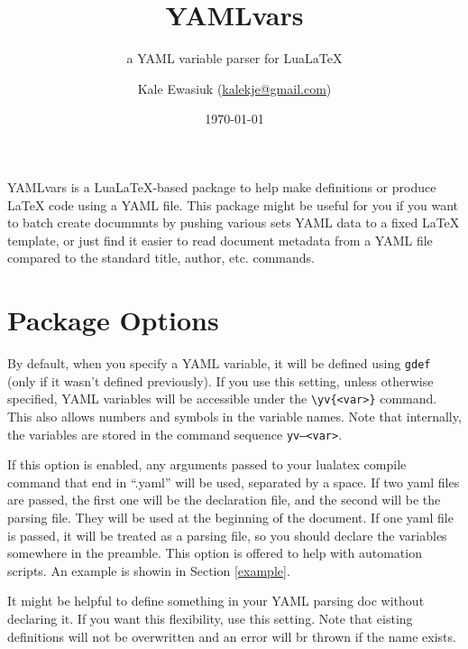 \documentclass[11pt,parskip=half]{scrartcl}
\author{Kale Ewasiuk (\url{kalekje@gmail.com})}
\date{\today}
\title{YAMLvars}
\subtitle{a YAML variable parser for LuaLaTeX}
\newcommand{\llcmd}[1]{\leavevmode\llap{\texttt{\detokenize{#1}\ }}}
\begin{document}
\maketitle








YAMLvars is a LuaLaTeX-based package to help make definitions or produce LaTeX code using a YAML file.
This package might be useful for you if you want to batch create docummnts
by pushing various sets YAML data to a fixed LaTeX template,
or just find it easier to read document metadata from a YAML file compared to the
standard title, author, etc. commands.

\section{Package Options}
\leavevmode{}By default, when you specify a YAML variable, it will be defined using \texttt{gdef}
(only if it wasn't defined previously).
If you use this setting, unless otherwise specified, YAML variables will be accessible under
the \texttt{\textbackslash yv\{<var>\}} command.
This also allows numbers and symbols in the variable names.
Note that internally, the variables are stored in the command sequence
\texttt{yv--<var>}.

\leavevmode{}If this option is enabled, any arguments passed to your lualatex compile
command that end in ``.yaml'' will be used, separated by a space.
If two yaml files are passed, the first one will be the declaration file,
and the second will be the parsing file.
They will be used at the beginning of the document.
If one yaml file is passed, it will be treated as a parsing file, so you should
declare the variables somewhere in the preamble.
This option is offered to help with automation scripts.
An example is showin in Section \ref{example}.

\hspace*{3ex}\llcmd{allowundeclared}%
It might be helpful to define something in your YAML parsing doc without declaring it.
If you want this flexibility, use this setting. Note that eisting definitions will not be overwritten and an error
will br thrown if the name exists.
\end{document}
